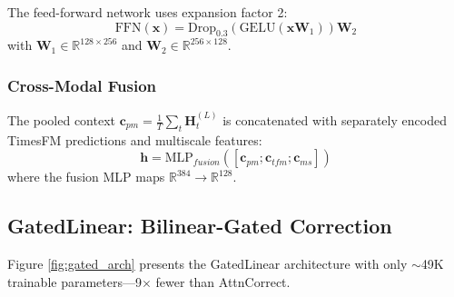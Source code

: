 \documentclass[10pt,conference]{IEEEtran}
\begin{document}
The feed-forward network uses expansion factor 2:
\begin{equation}
    \text{FFN}(\mathbf{x}) = \text{Drop}_{0.3}(\text{GELU}(\mathbf{x}\mathbf{W}_1))\mathbf{W}_2
\end{equation}
with $\mathbf{W}_1 \in \mathbb{R}^{128 \times 256}$ and $\mathbf{W}_2 \in \mathbb{R}^{256 \times 128}$.

\subsubsection{Cross-Modal Fusion}

The pooled context $\mathbf{c}_{pm} = \frac{1}{T}\sum_t \mathbf{H}^{(L)}_t$ is concatenated with separately encoded TimesFM predictions and multiscale features:
\begin{equation}
    \mathbf{h} = \text{MLP}_{fusion}([\mathbf{c}_{pm}; \mathbf{c}_{tfm}; \mathbf{c}_{ms}])
\end{equation}
where the fusion MLP maps $\mathbb{R}^{384} \to \mathbb{R}^{128}$.

\subsection{GatedLinear: Bilinear-Gated Correction}

Figure \ref{fig:gated_arch} presents the GatedLinear architecture with only ${\sim}$49K trainable parameters---9$\times$ fewer than AttnCorrect.
\end{document}
